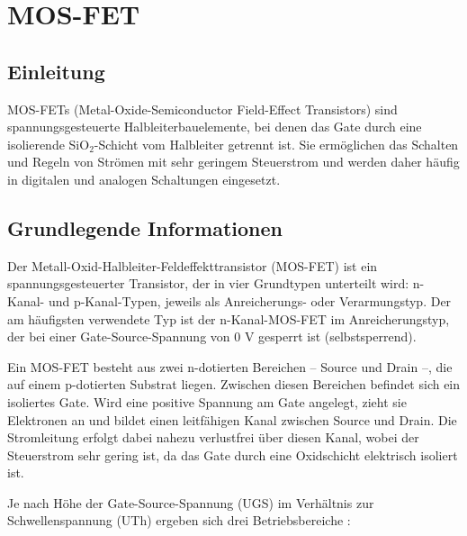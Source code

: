 %
%
%


\chapter{MOS-FET}\label{Mosfet}

\section{Einleitung}
MOS-FETs (Metal-Oxide-Semiconductor Field-Effect Transistors) sind spannungsgesteuerte Halbleiterbauelemente, bei denen das Gate durch eine isolierende SiO$_2$-Schicht vom Halbleiter getrennt ist. Sie ermöglichen das Schalten und Regeln von Strömen mit sehr geringem Steuerstrom und werden daher häufig in digitalen und analogen Schaltungen eingesetzt. \cite{Alles:2024}
\section{Grundlegende Informationen}
Der Metall-Oxid-Halbleiter-Feldeffekttransistor (MOS-FET) ist ein spannungsgesteuerter Transistor, der in vier Grundtypen unterteilt wird: n-Kanal- und p-Kanal-Typen, jeweils als Anreicherungs- oder Verarmungstyp. Der am häufigsten verwendete Typ ist der n-Kanal-MOS-FET im Anreicherungstyp, der bei einer Gate-Source-Spannung von 0 V gesperrt ist (selbstsperrend).\cite{Alles:2024}

Ein MOS-FET besteht aus zwei n-dotierten Bereichen – Source und Drain –, die auf einem p-dotierten Substrat liegen. Zwischen diesen Bereichen befindet sich ein isoliertes Gate. Wird eine positive Spannung am Gate angelegt, zieht sie Elektronen an und bildet einen leitfähigen Kanal zwischen Source und Drain. Die Stromleitung erfolgt dabei nahezu verlustfrei über diesen Kanal, wobei der Steuerstrom sehr gering ist, da das Gate durch eine Oxidschicht elektrisch isoliert ist.\cite{Alles:2024}

Je nach Höhe der Gate-Source-Spannung (UGS) im Verhältnis zur Schwellenspannung (UTh) ergeben sich drei Betriebsbereiche \cite{Alles:2024}:

